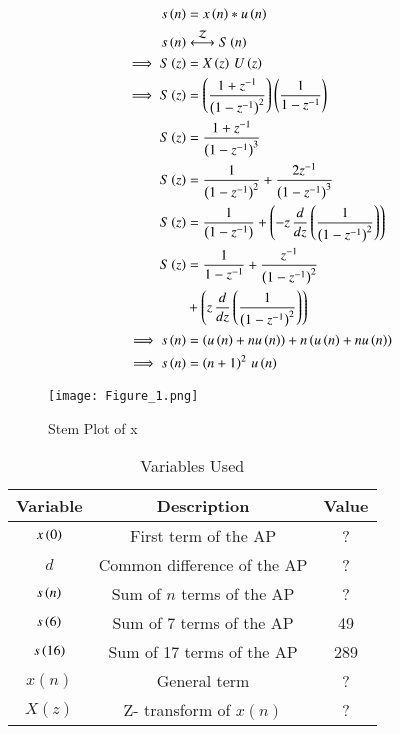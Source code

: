 \documentclass[journal,12pt,twocolumn]{IEEEtran}
\theoremstyle{remark}
\begin{document}
\begin{align}
   s\brak{n}&=x\brak{n}*u\brak{n}\\
   s\brak{n}&\system{Z}S\brak{n}\notag\\
   \implies S\brak{z}&=X\brak{z}\,U\brak{z}\\
   \implies S\brak{z}&=\brak{\frac{1+z^{-1}}{\brak{1-z^{-1}}^2}}\brak{\frac{1}{1-z^{-1}}}\\
   S\brak{z}&=\frac{1+z^{-1}}{\brak{1-z^{-1}}^3}\\
   S\brak{z}&=\frac{1}{\brak{1-z^{-1}}^2}+\frac{2z^{-1}}{\brak{1-z^{-1}}^3}\\
   S\brak{z}&=\frac{1}{\brak{1-z^{-1}}}+\brak{-z\,\frac{d}{dz}\brak{\frac{1}{\brak{1-z^{-1}}^2}}}\\
   S\brak{z}&=\frac{1}{1-z^{-1}}+\frac{z^{-1}}{\brak{1-z^{-1}}^2}\notag\\
   &+\brak{z\,\frac{d}{dz}\brak{\frac{1}{\brak{1-z^{-1}}^2}}}\\
   \implies s\brak{n}&=\brak{u\brak{n}+nu\brak{n}}+n\brak{u\brak{n}+nu\brak{n}}\\
   \implies s\brak{n}&=\brak{n+1}^2\,u\brak{n}
\end{align}
\begin{figure}[h!]
   \centering
   \texttt{[image: Figure\_1.png]}
   \caption{Stem Plot of x}
   \label{stemplot}
\end{figure}
\begin{table}[h!]    
   \begin{tabular}[12pt]{ |c| c| c|}
   \hline
   \textbf{Variable} & \textbf{Description} &\textbf{Value}\\ 
   \hline
   $x\left(0\right)$ & First term of the AP &?\\
   \hline 
   $d$ & Common difference of the AP& ?\\
   \hline
   $s\left(n\right)$ & Sum of $n$ terms of the AP& ?\\
   \hline
   $s\left(6\right)$& Sum of 7 terms of the AP& 49\\
   \hline
   $s\left(16\right)$& Sum of 17 terms of the AP&289\\
   \hline
   $x(n)$ & General term& ?\\
   \hline
   $X(z)$ & Z- transform of $x(n)$& ?\\
   \hline    
   \end{tabular}
   \caption{Variables Used}
   \label{tab10.5.3.9.1}
\end{table}
\end{document}

